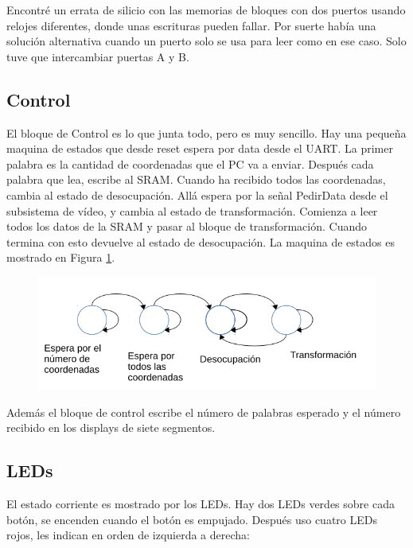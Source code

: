 \documentclass[a4paper]{article}
\begin{document}
Encontré un errata de silicio con las memorias de bloques con dos puertos usando relojes diferentes, donde unas escrituras pueden fallar. Por suerte había una solución alternativa cuando un puerto solo se usa para leer como en ese caso. Solo tuve que intercambiar puertas A y B.

\subsection{Control}

El bloque de Control es lo que junta todo, pero es muy sencillo. Hay una pequeña maquina de estados que desde reset espera por data desde el UART. La primer palabra es la cantidad de coordenadas que el PC va a enviar. Después cada palabra que lea, escribe al SRAM. Cuando ha recibido todos las coordenadas, cambia al estado de desocupación. Allá espera por la señal PedirData desde el subsistema de vídeo, y cambia al estado de transformación. Comienza a leer todos los datos de la SRAM y pasar al bloque de transformación. Cuando termina con esto devuelve al estado de desocupación. La maquina de estados es mostrado en Figura \ref{fig:control}.

\begin{figure}[!h]
\includegraphics[width=15cm]{img/control.png}
\label{fig:control}
\end{figure}

Además el bloque de control escribe el número de palabras esperado y el número recibido en los displays de siete segmentos.

\subsection{LEDs}

El estado corriente es mostrado por los LEDs. Hay dos LEDs verdes sobre cada botón, se encenden cuando el botón es empujado. Después uso cuatro LEDs rojos, les indican en orden de izquierda a derecha:
\end{document}
